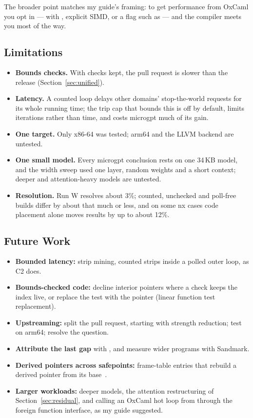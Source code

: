 The broader point matches my guide's framing: to get performance from OxCaml
you opt in --- with , explicit SIMD, or a flag such as
 --- and the compiler meets you most of the way.

\subsection{Limitations}
\begin{itemize}
  \item \textbf{Bounds checks.} With checks kept, the pull request is slower
        than the release (Section~\ref{sec:unified}).
  \item \textbf{Latency.} A counted loop delays other domains'
        stop-the-world requests for its whole running time; the trip cap that
        bounds this is off by default, limits iterations rather than time,
        and costs microgpt much of its gain.
  \item \textbf{One target.} Only x86-64 was tested; arm64 and the LLVM
        backend are untested.
  \item \textbf{One small model.} Every microgpt conclusion rests on one
        34\,KB model, and the width sweep used one layer, random weights and a
        short context; deeper and attention-heavy models are untested.
  \item \textbf{Resolution.} Run W resolves about 3\%; counted, unchecked and
        poll-free builds differ by about that much or less, and on some nx
        cases code placement alone moves results by up to about 12\%.
\end{itemize}

\subsection{Future Work}
\begin{itemize}
  \item \textbf{Bounded latency:} strip mining, counted strips inside a polled
        outer loop, as C2 does.
  \item \textbf{Bounds-checked code:} decline interior pointers where a check
        keeps the index live, or replace the test with the pointer (linear
        function test replacement).
  \item \textbf{Upstreaming:} split the pull request, starting with strength
        reduction; test on arm64; resolve the  question.
  \item \textbf{Attribute the last gap} with , and measure
        wider programs with Sandmark.
  \item \textbf{Derived pointers across safepoints:} frame-table entries that
        rebuild a derived pointer from its
        base~\cite{diwan1992compiler,llvm_statepoints}.
  \item \textbf{Larger workloads:} deeper models, the attention
        restructuring of Section~\ref{sec:residual}, and calling an OxCaml hot
        loop from  through the foreign function interface, as
        my guide suggested.
\end{itemize}
